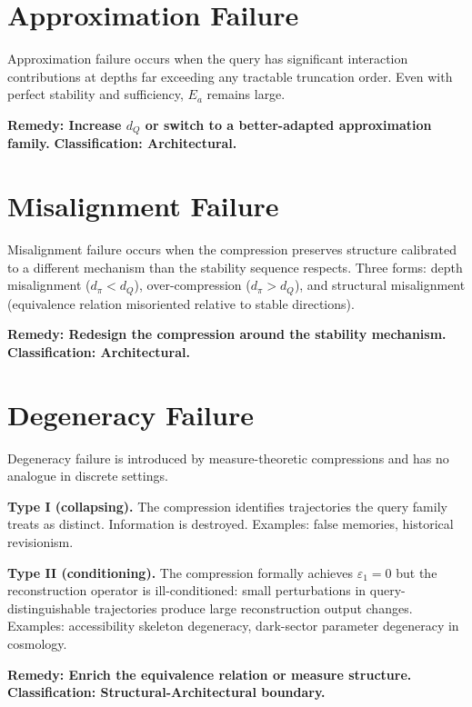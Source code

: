\section{Approximation Failure}

Approximation failure occurs when the query has significant interaction contributions at depths far exceeding any tractable truncation order. Even with perfect stability and sufficiency, $E_a$ remains large.

\textbf{Remedy: Increase $d_Q$ or switch to a better-adapted approximation family.} \textbf{Classification: Architectural.}

\section{Misalignment Failure}

Misalignment failure occurs when the compression preserves structure calibrated to a different mechanism than the stability sequence respects. Three forms: depth misalignment ($d_\pi < d_Q$), over-compression ($d_\pi > d_Q$), and structural misalignment (equivalence relation misoriented relative to stable directions).

\textbf{Remedy: Redesign the compression around the stability mechanism.} \textbf{Classification: Architectural.}

\section{Degeneracy Failure}

Degeneracy failure is introduced by measure-theoretic compressions and has no analogue in discrete settings.

\textbf{Type I (collapsing).} The compression identifies trajectories the query family treats as distinct. Information is destroyed. Examples: false memories, historical revisionism.

\textbf{Type II (conditioning).} The compression formally achieves $\varepsilon_1 = 0$ but the reconstruction operator is ill-conditioned: small perturbations in query-distinguishable trajectories produce large reconstruction output changes. Examples: accessibility skeleton degeneracy, dark-sector parameter degeneracy in cosmology.

\textbf{Remedy: Enrich the equivalence relation or measure structure.} \textbf{Classification: Structural-Architectural boundary.}

